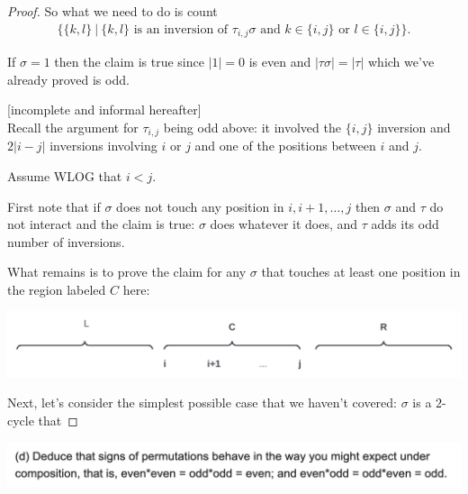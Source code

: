 \begin{proof}
  So what we need to do is count
  \begin{align*}
    \Big\{\{k, l\} ~\big |~ \{k, l\} \text{~is an inversion of~} \tau_{i,j}\sigma \text{~and~} k \in \{i, j\} \text{~or~} l \in \{i, j\}\Big\}.
  \end{align*}


  If $\sigma = 1$ then the claim is true since $|1| = 0$ is even and $|\tau\sigma| = |\tau|$ which we've already
  proved is odd.

  [incomplete and informal hereafter]\\

  Recall the argument for $\tau_{i,j}$ being odd above: it involved the $\{i, j\}$ inversion
  and $2|i - j|$ inversions involving $i$ or $j$ and one of the positions between $i$ and $j$.

  Assume WLOG that $i < j$.

  First note that if $\sigma$ does not touch any position in $i, i+1, \ldots, j$ then $\sigma$ and
  $\tau$ do not interact and the claim is true: $\sigma$ does whatever it does, and $\tau$ adds its odd number
  of inversions.

  What remains is to prove the claim for any $\sigma$ that touches at least one position in the region
  labeled $C$ here:

    \includegraphics[width=400pt]{img/abstract-algebra--nf--2-b9b0.png}








  Next, let's consider the simplest possible case that we haven't covered: $\sigma$ is a $2$-cycle that



\end{proof}


\begin{mdframed}
\includegraphics[width=400pt]{img/algebra--nf--2-05a9.png}
\end{mdframed}

